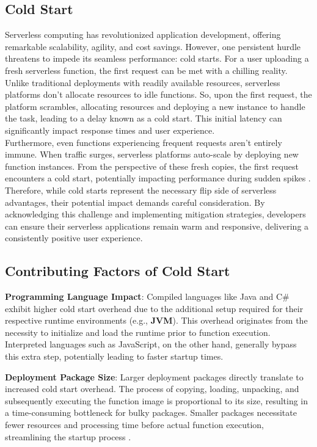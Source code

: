\subsection{Cold Start}

Serverless computing has revolutionized application development, offering remarkable scalability, agility, and cost savings. However, one persistent hurdle threatens to impede its seamless performance: cold starts. For a user uploading a fresh serverless function, the first request can be met with a chilling reality. Unlike traditional deployments with readily available resources, serverless platforms don't allocate resources to idle functions. So, upon the first request, the platform scrambles, allocating resources and deploying a new instance to handle the task, leading to a delay known as a cold start. This initial latency can significantly impact response times and user experience\cite{LYYO21}.\\

Furthermore, even functions experiencing frequent requests aren't entirely immune. When traffic surges, serverless platforms auto-scale by deploying new function instances. From the perspective of these fresh copies, the first request encounters a cold start, potentially impacting performance during sudden spikes \cite{LYYO21}.\\

Therefore, while cold starts represent the necessary flip side of serverless advantages, their potential impact demands careful consideration. By acknowledging this challenge and implementing mitigation strategies, developers can ensure their serverless applications remain warm and responsive, delivering a consistently positive user experience.

\subsection{Contributing Factors of Cold Start}

\textbf{Programming Language Impact}: Compiled languages like Java and C\# exhibit higher cold start overhead due to the additional setup required for their respective runtime environments (e.g., \textbf {\ac{JVM}}). This overhead originates from the necessity to initialize and load the runtime prior to function execution. Interpreted languages such as JavaScript, on the other hand, generally bypass this extra step, potentially leading to faster startup times\cite{MEHW18}.

\textbf{Deployment Package Size}: Larger deployment packages directly translate to increased cold start overhead. The process of copying, loading, unpacking, and subsequently executing the function image is proportional to its size, resulting in a time-consuming bottleneck for bulky packages. Smaller packages necessitate fewer resources and processing time before actual function execution, streamlining the startup process \cite{MEHW18}.

